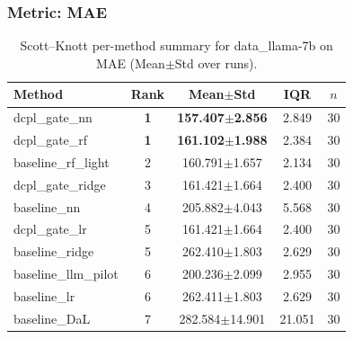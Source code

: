 \subsubsection*{Metric: MAE}
\begin{table}[H]
\centering
\scriptsize
\setlength{\tabcolsep}{4pt}
\renewcommand{\arraystretch}{1.1}
\caption{Scott--Knott per-method summary for data\_llama-7b on MAE (Mean$\pm$Std over runs).}
\label{tab:sk_data_llama-7b_MAE}
\begin{tabular}{l|c|c|c|c}
\hline
\textbf{Method} & \textbf{Rank} & \textbf{Mean$\pm$Std} & \textbf{IQR} & \textbf{$n$} \\
\hline
\rowcolor{red!15} dcpl\_gate\_nn & \textbf{1} & \textbf{157.407$\pm$2.856} & 2.849 & 30 \\
\rowcolor{red!15} dcpl\_gate\_rf & \textbf{1} & \textbf{161.102$\pm$1.988} & 2.384 & 30 \\
baseline\_rf\_light & 2 & 160.791$\pm$1.657 & 2.134 & 30 \\
dcpl\_gate\_ridge & 3 & 161.421$\pm$1.664 & 2.400 & 30 \\
baseline\_nn & 4 & 205.882$\pm$4.043 & 5.568 & 30 \\
dcpl\_gate\_lr & 5 & 161.421$\pm$1.664 & 2.400 & 30 \\
baseline\_ridge & 5 & 262.410$\pm$1.803 & 2.629 & 30 \\
baseline\_llm\_pilot & 6 & 200.236$\pm$2.099 & 2.955 & 30 \\
baseline\_lr & 6 & 262.411$\pm$1.803 & 2.629 & 30 \\
baseline\_DaL & 7 & 282.584$\pm$14.901 & 21.051 & 30 \\
\hline
\end{tabular}
\end{table}


